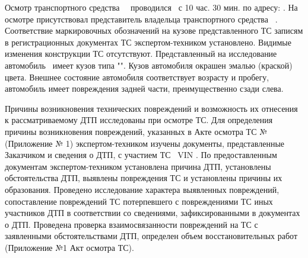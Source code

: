 \noindent \begin{spacing}{1.2}{ Осмотр транспортного средства \, \, проводился \osm\, с 10 час. 30 мин.  по адресу: . На осмотре присутствовал представитель владельца транспортного средства    \, .  %
Соответствие маркировочных обозначений на кузове представленного ТС записям в регистрационных документах ТС экс\-пертом-техником установлено. Видимые изменения конструкции ТС отсутствуют.  Представленный на исследование автомобиль \tc\, имеет кузов типа "". Кузов автомобиля окрашен %
эмалью (краской) \colr\, цвета.  Внешнее состояние автомобиля соответствует возрасту и пробегу, автомобиль имеет повреждения  задней части, преимущественно сзади слева. }     %
\par Причины возникновения технических повреждений и возможность их отнесения к рассматриваемому ДТП исследованы при осмотре ТС. 
Для определения причины возникновения повреждений, указанных в Акте осмотра ТС 
№ \NomerDoc \, (Приложение № 1) экспертом-техником изучены документы, представленные Заказчиком и сведения о ДТП, с участием ТС  \, VIN  . %
По предоставленным документам экспертом-техником установлена причина ДТП, установлены обстоятельства ДТП, выявлены повреждения ТС и установлены причины их образования. Проведено исследование характера выявленных повреждений, сопоставление повреждений ТС потерпевшего с повреждениями ТС иных участников ДТП в соответствии со сведениями, зафиксированными в документах о ДТП. Проведена проверка взаимосвязанности повреждений на ТС с заявленными обстоятельствами ДТП, определен объем восстановительных работ (Приложение №1 Акт осмотра ТС). 
\end{spacing}

